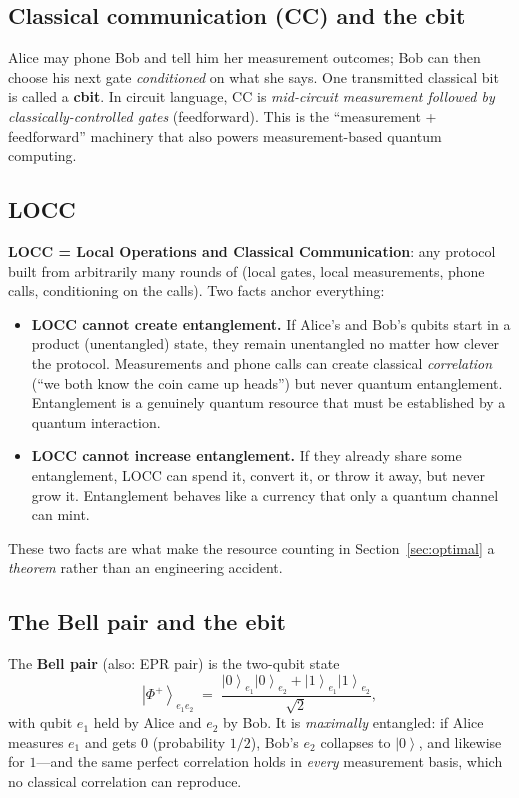 \documentclass[11pt]{article}
\newcommand{\ket}[1]{\left|#1\right\rangle}
\newcommand{\Phip}{\ket{\Phi^{+}}}
\begin{document}
\subsection{Classical communication (CC) and the cbit}

Alice may phone Bob and tell him her measurement outcomes; Bob can then
choose his next gate \emph{conditioned} on what she says. One transmitted
classical bit is called a \textbf{cbit}. In circuit language, CC is
\emph{mid-circuit measurement followed by classically-controlled gates}
(feedforward). This is the ``measurement + feedforward'' machinery that also
powers measurement-based quantum computing.

\subsection{LOCC}

\textbf{LOCC = Local Operations and Classical Communication}: any protocol
built from arbitrarily many rounds of (local gates, local measurements,
phone calls, conditioning on the calls). Two facts anchor everything:

\begin{itemize}[leftmargin=2em]
  \item \textbf{LOCC cannot create entanglement.} If Alice's and Bob's qubits
        start in a product (unentangled) state, they remain unentangled no
        matter how clever the protocol. Measurements and phone calls can
        create classical \emph{correlation} (``we both know the coin came up
        heads'') but never quantum entanglement. Entanglement is a genuinely
        quantum resource that must be established by a quantum interaction.
  \item \textbf{LOCC cannot increase entanglement.} If they already share
        some entanglement, LOCC can spend it, convert it, or throw it away,
        but never grow it. Entanglement behaves like a currency that only a
        quantum channel can mint.
\end{itemize}

These two facts are what make the resource counting in
Section~\ref{sec:optimal} a \emph{theorem} rather than an engineering
accident.

\subsection{The Bell pair and the ebit}
\label{sec:ebit}

The \textbf{Bell pair} (also: EPR pair) is the two-qubit state
\[
\Phip_{e_1 e_2}
   \;=\; \frac{\ket{0}_{e_1}\ket{0}_{e_2} + \ket{1}_{e_1}\ket{1}_{e_2}}{\sqrt{2}},
\]
with qubit $e_1$ held by Alice and $e_2$ by Bob. It is \emph{maximally}
entangled: if Alice measures $e_1$ and gets $0$ (probability $1/2$), Bob's
$e_2$ collapses to $\ket{0}$, and likewise for $1$---and the same perfect
correlation holds in \emph{every} measurement basis, which no classical
correlation can reproduce.
\end{document}
